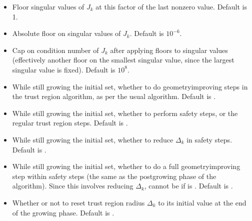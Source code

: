 \documentclass[letterpaper,10pt,english]{sphinxmanual}
\begin{document}
\begin{itemize}
\item {} 
 \sphinxhyphen{} Floor singular values of \(J_k\) at this factor of the last nonzero value. Default is 1.

\item {} 
 \sphinxhyphen{} Absolute floor on singular values of \(J_k\). Default is \(10^{-6}\).

\item {} 
 \sphinxhyphen{} Cap on condition number of \(J_k\) after applying floors to singular values (effectively another floor on the smallest singular value, since the largest singular value is fixed). Default is \(10^8\).

\item {} 
 \sphinxhyphen{} While still growing the initial set, whether to do geometry\sphinxhyphen{}improving steps in the trust region algorithm, as per the usual algorithm. Default is .

\item {} 
 \sphinxhyphen{} While still growing the initial set, whether to perform safety steps, or the regular trust region steps. Default is .

\item {} 
 \sphinxhyphen{} While still growing the initial set, whether to reduce \(\Delta_k\) in safety steps. Default is .

\item {} 
 \sphinxhyphen{} While still growing the initial set, whether to do a full geometry\sphinxhyphen{}improving step within safety steps (the same as the post\sphinxhyphen{}growing phase of the algorithm). Since this involves reducing \(\Delta_k\), cannot be  if  is . Default is .

\item {} 
 \sphinxhyphen{} Whether or not to reset trust region radius \(\Delta_k\) to its initial value at the end of the growing phase. Default is .


\end{itemize}
\end{document}
